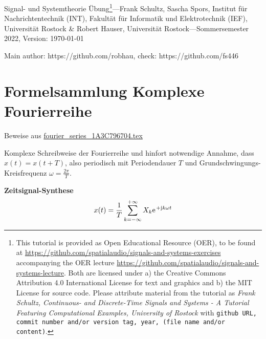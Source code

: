 \documentclass[11pt,a4paper,DIV=12]{scrartcl}
\begin{document}
%
\noindent Signal- und Systemtheorie Übung\footnote{This tutorial is provided as
Open Educational Resource (OER), to be found at
\url{https://github.com/spatialaudio/signals-and-systems-exercises}
accompanying the OER lecture
\url{https://github.com/spatialaudio/signals-and-systems-lecture}.
%
Both are licensed under a) the Creative Commons Attribution 4.0 International
License for text and graphics and b) the MIT License for source code.
%
Please attribute material from the tutorial as \textit{Frank Schultz,
Continuous- and Discrete-Time Signals and Systems - A Tutorial Featuring
Computational Examples, University of Rostock} with
\texttt{github URL, commit number and/or version tag, year, (file name and/or
content)}.}---Frank Schultz, Sascha Spors,
Institut für Nachrichtentechnik (INT),
Fakultät für Informatik und Elektrotechnik (IEF),
Universität Rostock \&
Robert Hauser, Universität Rostock---Sommersemester 2022, Version: \today
%

\noindent Main author: https://github.com/robhau, check: https://github.com/fs446

\section*{Formelsammlung Komplexe Fourierreihe}
%
Beweise aus \url{fourier_series_1A3C796704.tex}
%

\noindent Komplexe Schreibweise der Fourierreihe und hinfort notwendige Annahme,
dass $x(t) = x(t+T)$, also periodisch mit Periodendauer $T$ und
Grundschwingungs-Kreisfrequenz $\omega=\frac{2\pi}{T}$.

\textbf{Zeitsignal-Synthese}
\begin{align}
	x(t)=\frac{1}{T}\sum_{k=-\infty}^{+\infty}X_k\e^{+\im k \omega t}
\end{align}
\end{document}
